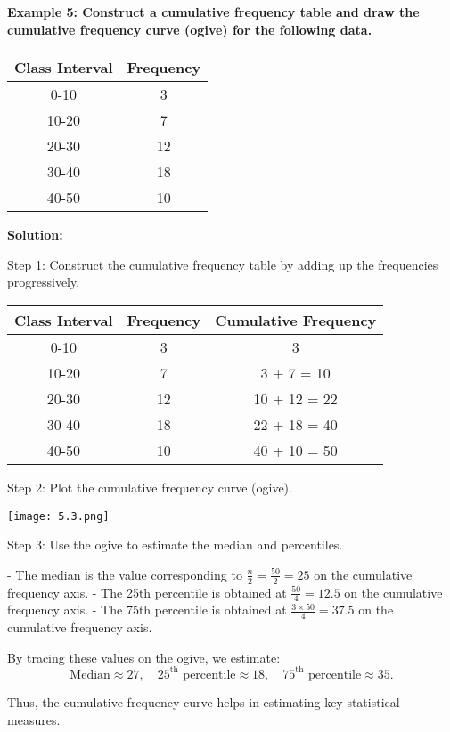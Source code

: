 \begin{flushleft}
	\textbf{Example 5: Construct a cumulative frequency table and draw the cumulative frequency curve (ogive) for the following data.}
	
	\vspace{0.5cm}
	
	\begin{center}
		\begin{tabular}{c|c}
			\textbf{Class Interval} & \textbf{Frequency} \\
			\hline
			0-10 & 3 \\
			10-20 & 7 \\
			20-30 & 12 \\
			30-40 & 18 \\
			40-50 & 10 \\
		\end{tabular}
	\end{center}
	
	\vspace{0.5cm}
	\textbf{Solution:}
	\vspace{0.5cm}
	
	Step 1: Construct the cumulative frequency table by adding up the frequencies progressively.
	
	\vspace{0.5cm}
	
	\begin{center}
		\begin{tabular}{c|c|c}
			\textbf{Class Interval} & \textbf{Frequency} & \textbf{Cumulative Frequency} \\
			\hline
			0-10 & 3 & 3 \\
			10-20 & 7 & 3 + 7 = 10 \\
			20-30 & 12 & 10 + 12 = 22 \\
			30-40 & 18 & 22 + 18 = 40 \\
			40-50 & 10 & 40 + 10 = 50 \\
		\end{tabular}
	\end{center}
	
	\vspace{0.5cm}
	Step 2: Plot the cumulative frequency curve (ogive).
	
	\begin{center}
		\texttt{[image: 5.3.png]}
	\end{center}
	
	Step 3: Use the ogive to estimate the median and percentiles.
	
	- The median is the value corresponding to $\frac{n}{2} = \frac{50}{2} = 25$ on the cumulative frequency axis.
	- The 25th percentile is obtained at $\frac{50}{4} = 12.5$ on the cumulative frequency axis.
	- The 75th percentile is obtained at $\frac{3 \times 50}{4} = 37.5$ on the cumulative frequency axis.
	
	By tracing these values on the ogive, we estimate:
	\[
	\text{Median} \approx 27, \quad 25^\text{th} \text{ percentile} \approx 18, \quad 75^\text{th} \text{ percentile} \approx 35.
	\]
	
	Thus, the cumulative frequency curve helps in estimating key statistical measures.
\end{flushleft}
